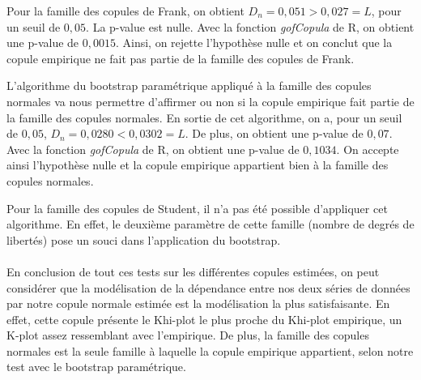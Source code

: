 Pour la famille des copules de Frank, on obtient $D_n = 0,051 > 0,027 = L$, pour un seuil de $0,05$. La p-value est nulle. Avec la fonction \textit{gofCopula} de R, on obtient une p-value de $0,0015$. 
Ainsi, on rejette l'hypothèse nulle et on conclut que la copule empirique ne fait pas partie de la famille des copules de Frank.

L'algorithme du bootstrap paramétrique appliqué à la famille des copules normales va nous permettre d'affirmer ou non si la copule empirique fait partie de la famille des copules normales. En sortie de cet algorithme, on a, pour un seuil de $0,05$, $D_n = 0,0280 < 0,0302 = L$. De plus, on obtient une p-value de $0,07$. Avec la fonction \textit{gofCopula} de R, on obtient une p-value de $0,1034$. 
On accepte ainsi l'hypothèse nulle et la copule empirique appartient bien à la famille des copules normales.

Pour la famille des copules de Student, il n'a pas été possible d'appliquer cet algorithme. En effet, le deuxième paramètre de cette famille (nombre de degrés de libertés) pose un souci dans l'application du bootstrap. \\ \\


En conclusion de tout ces tests sur les différentes copules estimées, on peut considérer que la modélisation de la dépendance entre nos deux séries de données par notre copule normale estimée est la modélisation la plus satisfaisante. En effet, cette copule présente le Khi-plot le plus proche du Khi-plot empirique, un K-plot assez ressemblant avec l'empirique. De plus, la famille des copules normales est la seule famille à laquelle la copule empirique appartient, selon notre test avec le bootstrap paramétrique.




